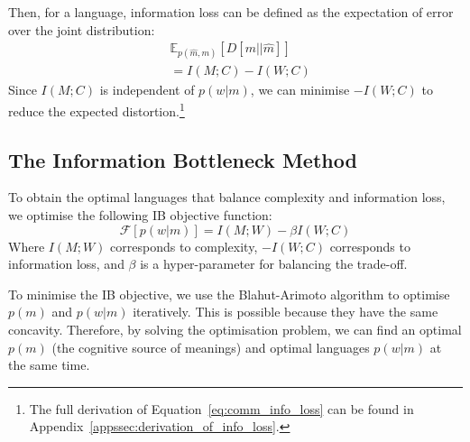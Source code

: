 \documentclass[11pt]{article}
\begin{document}
Then, for a language, information loss can be defined as the expectation of error over the joint distribution:
\begin{equation}
    \begin{split}
        & \mathbb{E}_{p(\hat{m},m)}\left[D[m||\hat{m}]\right] \\
        & = I(M;C) - I(W;C)
    \end{split}
    \label{eq:comm_info_loss}
\end{equation}
Since $I(M;C)$ is independent of $p(w|m)$, we can minimise $-I(W;C)$ to reduce the expected distortion.\footnote{The full derivation of Equation~\ref{eq:comm_info_loss} can be found in Appendix~\ref{appssec:derivation_of_info_loss}.}

\subsection{The Information Bottleneck Method}

To obtain the optimal languages that balance complexity and information loss, we optimise the following IB objective function:
\begin{equation}
    \mathcal{F}[p(w|m)] = I(M;W) - \beta I(W;C)
    \label{eq:comm_IB_objective}
\end{equation}
Where $I(M;W)$ corresponds to complexity, $-I(W;C)$ corresponds to information loss, and $\beta$ is a hyper-parameter for balancing the trade-off.

To minimise the IB objective, we use the Blahut-Arimoto algorithm \citep{arimoto1972algorithm, blahut1972computation} to optimise $p(m)$ and $p(w|m)$ iteratively.
This is possible because they have the same concavity.
Therefore, by solving the optimisation problem, we can find an optimal $p(m)$ (the cognitive source of meanings) and optimal languages $p(w|m)$ at the same time.
\end{document}
